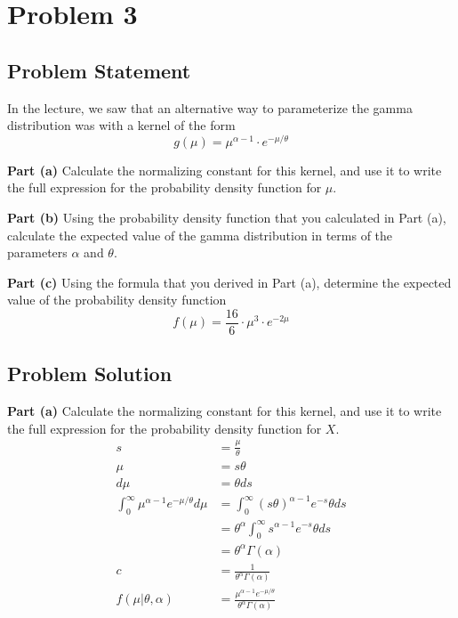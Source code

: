 \documentclass[12pt]{article}
\theoremstyle{definition}
\begin{document}
\newpage
\section*{Problem 3}

\subsection*{Problem Statement}

In the lecture, we saw that an alternative way to parameterize the gamma distribution was with a kernel of the form
$$
g(\mu) = \mu^{\alpha - 1} \cdot e^{-\mu/\theta}
$$

\bigskip
\noindent
{\bf Part (a)} Calculate the normalizing constant for this kernel, and use it to write the full expression for the probability density function for $\mu$.

\bigskip
\noindent
{\bf Part (b)} Using the probability density function that you calculated in Part (a), calculate the expected value of the gamma distribution in terms of the parameters $\alpha$ and $\theta$.

\bigskip
\noindent
{\bf Part (c)} Using the formula that you derived in Part (a), determine the expected value of the probability density function
$$
f(\mu) = \frac{16}{6} \cdot \mu^3 \cdot e^{-2\mu}
$$


\subsection*{Problem Solution}

\noindent
{\bf Part (a)} Calculate the normalizing constant for this kernel, and use it to write the full expression for the probability density function for $X$.
\begin{align*}
s &= \frac{\mu}{\theta}\\
\mu &= s\theta\\
d\mu &= \theta ds\\
\int_0^\infty \mu^{\alpha - 1} e^{-\mu/\theta}d\mu &= \int_0^\infty (s\theta)^{\alpha - 1} e^{-s}\theta ds\\
&= \theta^\alpha \int_0^\infty s^{\alpha - 1} e^{-s}\theta ds\\
&= \theta^\alpha\Gamma(\alpha)\\
c &= \frac{1}{\theta^\alpha\Gamma(\alpha)}\\
f(\mu|\theta, \alpha) &= \frac{\mu^{\alpha - 1} e^{-\mu/\theta}}{\theta^\alpha\Gamma(\alpha)} 
\end{align*}
\end{document}
